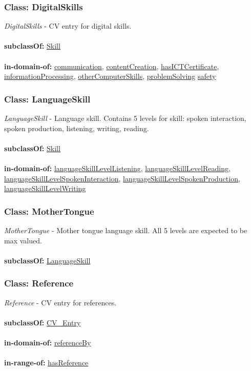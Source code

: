 \documentclass[a4paper,12pt]{article}
\numberwithin{equation}{section}
\begin{document}
\subsubsection{Class: DigitalSkills}\hypertarget{DigitalSkills}{}
\textit{DigitalSkills} - CV entry for digital skills.
\\\\
\textbf{subclassOf:} \hyperlink{Skill}{Skill}
\\\\
\textbf{in-domain-of:} \hyperlink{communication}{communication}, \hyperlink{contentCreation}{contentCreation}, \hyperlink{hasICTCertificate}{hasICTCertificate},  \hyperlink{informationProcessing}{informationProcessing}, \hyperlink{otherComputerSkills}{otherComputerSkills}, \hyperlink{problemSolving}{problemSolving} \hyperlink{safety}{safety}

\subsubsection{Class: LanguageSkill}\hypertarget{LanguageSkill}{}
\textit{LanguageSkill} - Language skill. Contains 5 levels for skill: spoken interaction, spoken production, listening, writing, reading.
\\\\
\textbf{subclassOf:} \hyperlink{Skill}{Skill}
\\\\
\textbf{in-domain-of:} \hyperlink{languageSkillLevelListening}{languageSkillLevelListening}, \hyperlink{languageSkillLevelReading}{languageSkillLevelReading}, \hyperlink{languageSkillLevelSpokenInteraction}{languageSkillLevelSpokenInteraction}, \hyperlink{languageSkillLevelSpokenProduction}{languageSkillLevelSpokenProduction}, \hyperlink{languageSkillLevelWriting}{languageSkillLevelWriting}

\subsubsection{Class: MotherTongue}\hypertarget{MotherTongue}{}
\textit{MotherTongue} - Mother tongue language skill. All 5 levels are expected to be max valued.
\\\\
\textbf{subclassOf:} \hyperlink{LanguageSkill}{LanguageSkill}

\subsubsection{Class: Reference}\hypertarget{Reference}{}
\textit{Reference} - CV entry for references.
\\\\
\textbf{subclassOf:} \hyperlink{CV\_Entry}{CV\_Entry}
\\\\
\textbf{in-domain-of:} \hyperlink{referenceBy}{referenceBy}
\\\\
\textbf{in-range-of:} \hyperlink{hasReference}{hasReference}
\end{document}
